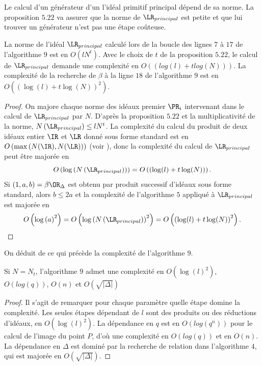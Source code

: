 Le calcul d'un générateur d'un l'idéal primitif principal dépend de sa norme. La proposition $5.22$ va assurer que la norme de $\LR_{principal}$ est petite et que lui trouver un générateur n'est pas une étape coûteuse. 

\begin{Prop}
	La norme de l'idéal $\LR_{principal}$ calculé lors de la boucle des lignes $7$ à $17$ de l'algorithme $9$ est en $O(lN^t)$. Avec le choix de $t$ de la proposition $5.22$, le calcul de $\LR_{principal}$ demande une complexité en $O\left( \left( log(l) + tlog(N)\right) \right)$. La complexité de la recherche de $\beta$ à la ligne $18$ de l'algorithme $9$ est en $O\left( \left( \log(l) + t\log(N)\right)^{2} \right)$.
\end{Prop}

\begin{proof}
	On majore chaque norme des idéaux premier $\PR_{i}$ intervenant dans le calcul de $\LR_{principal}$ par $N$. D'après la proposition $5.22$ et la multiplicativité de la norme, $N\left(\LR_{principal} \right) \leq lN^t$. La complexité du calcul du produit de deux idéaux entier $\IR$ et $\LR$ donné sous forme standard est en $O\left( \max\left( N(\IR),N(\LR)\right) \right)$ (voir \cite{JaoSoukharev}), donc la complexité du calcul de $\LR_{principal}$ peut être majorée en 
	\begin{equation*}
		O\left(\log\left(N\left(\LR_{principal}\right)\right)\right) = O\left( \left( \log(l) + t\log(N)\right) \right).
	\end{equation*} 
	Si $(1,a,b) = \beta\OR_{\Delta}$ est obtenu par produit successif d'idéaux sous forme standard, alors $b\leq 2a$ et la complexité de l'algorithme $5$ appliqué à $\LR_{principal}$ est majorée en 
	\begin{equation*}
		O\left( \log\left(a  \right)^2 \right) = O\left( \log\left(N\left(\LR_{principal} \right)  \right)^2 \right) = O\left( \left( \log(l) + t\log(N)\right)^{2} \right).
	\end{equation*}
\end{proof}

On déduit de ce qui précède la complexité de l'algorithme $9$. 

\begin{Prop}
	Si $N = N_{t}$, l'algorithme $9$ admet une complexité en $O(\log(l)^2)$, $O(log(q))$, $O(n)$ et $O(\sqrt{|\Delta|})$
\end{Prop}

\begin{proof}
	Il s'agit de remarquer pour chaque paramètre quelle étape domine la complexité. Les seules étapes dépendant de $l$ sont des produits ou des réductions d'idéaux, en $O(\log(l)^2)$. La dépendance en $q$ est en $O(log(q^n))$ pour le calcul de l'image du point $P$, d'où une complexité en $O(log(q))$ et en $O(n)$. La dépendance en $\Delta$ est dominé par la recherche de relation dans l'algorithme $4$, qui est majorée en $O(\sqrt{|\Delta|})$. 
\end{proof}

